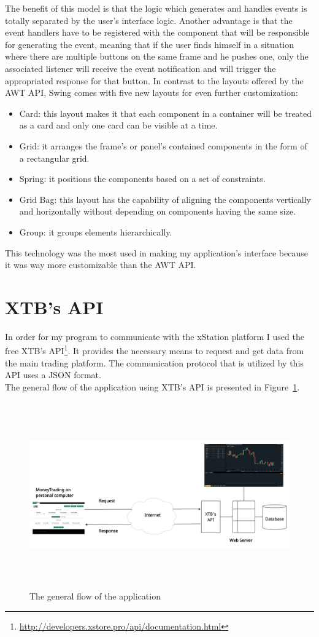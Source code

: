 \documentclass[12pt,a4paper]{report}
\begin{document}
The benefit of this model is that the logic which generates and handles events is totally separated by the user's interface logic. Another advantage is that the event handlers have to be registered with the component that will be responsible for generating the event, meaning that if the user finds himself in a situation where there are multiple buttons on the same frame and he pushes one, only the associated listener will receive the event notification and will trigger the appropriated response for that button.
In contrast to the layouts offered by the AWT API, Swing comes with five new layouts for even further customization:
\begin{itemize}
	\item Card: this layout makes it that each component in a container will be treated as a card and only one card can be visible at a time.  
	\item Grid: it arranges the frame's or panel's contained components in the form of a rectangular grid.
	\item Spring: it positions the components based on a set of constraints. 
	\item Grid Bag: this layout has the capability of aligning the components vertically and horizontally without depending on components having the same size.  
	\item Group: it groups elements hierarchically.
\end{itemize}
This technology was the most used in making my application's interface because it was way more customizable than the AWT API. 
\section{XTB's API}
In order for my program to communicate with the xStation platform I used the free XTB's API\footnote{\url{http://developers.xstore.pro/api/documentation.html}}. It provides the necessary means to request and get data from the main trading platform. The communication protocol that is utilized by this API uses a JSON format.\\
The general flow of the application using XTB's API is presented in Figure~\ref{fig:flow}.
\begin{figure}[!ht]
	\centering
	\includegraphics[width=16cm,height=8cm]{pics/flow.png}
	\caption{The general flow of the application}
	\label{fig:flow}
\end{figure}
\end{document}
